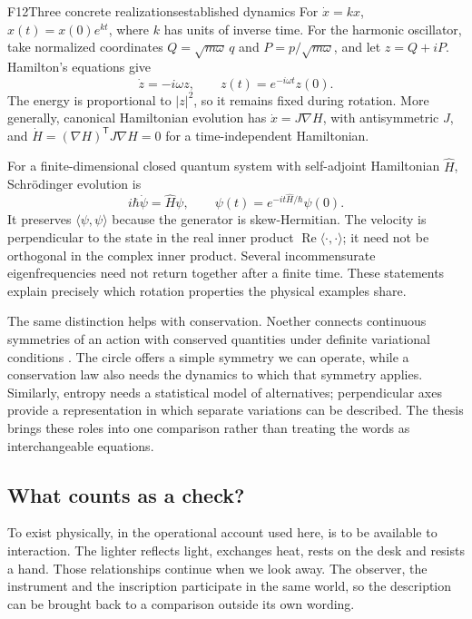 \documentclass[11pt,a4paper]{article}
\DeclareMathOperator{\Real}{Re}
\begin{document}
\begin{formal}{F12}{Three concrete realizations}{established dynamics}
For $\dot x=kx$, $x(t)=x(0)e^{kt}$, where $k$ has units of inverse time. For
the harmonic oscillator, take normalized coordinates
$Q=\sqrt{m\omega}\,q$ and $P=p/\sqrt{m\omega}$, and let $z=Q+iP$.
Hamilton's equations give
\begin{equation}
 \dot z=-i\omega z,\qquad z(t)=e^{-i\omega t}z(0).
\end{equation}
The energy is proportional to $|z|^2$, so it remains fixed during rotation.
More generally, canonical Hamiltonian evolution has
$\dot x=J\nabla H$, with antisymmetric $J$, and
$\dot H=(\nabla H)^\mathsf{T}J\nabla H=0$ for a time-independent Hamiltonian.

For a finite-dimensional closed quantum system with self-adjoint Hamiltonian
$\widehat H$, Schr\"odinger evolution is
\begin{equation}
 i\hbar\dot\psi=\widehat H\psi,\qquad
 \psi(t)=e^{-it\widehat H/\hbar}\psi(0).
\end{equation}
It preserves $\langle\psi,\psi\rangle$ because the generator is skew-Hermitian.
The velocity is perpendicular to the state in the real inner product
$\Real\langle\cdot,\cdot\rangle$; it need not be orthogonal in the complex
inner product. Several incommensurate eigenfrequencies need not return together
after a finite time. These statements explain precisely which rotation
properties the physical examples share.
\end{formal}

The same distinction helps with conservation. Noether connects continuous
symmetries of an action with conserved quantities under definite variational
conditions \citep{Noether1918}. The circle offers a simple symmetry we can
operate, while a conservation law also needs the dynamics to which that
symmetry applies. Similarly, entropy needs a statistical model of alternatives;
perpendicular axes provide a representation in which separate variations can
be described. The thesis brings these roles into one comparison rather than
treating the words as interchangeable equations.

\subsection{What counts as a check?}
To exist physically, in the operational account used here, is to be available
to interaction. The lighter reflects light, exchanges heat, rests on the desk
and resists a hand. Those relationships continue when we look away. The
observer, the instrument and the inscription participate in the same world,
so the description can be brought back to a comparison outside its own wording.
\end{document}
